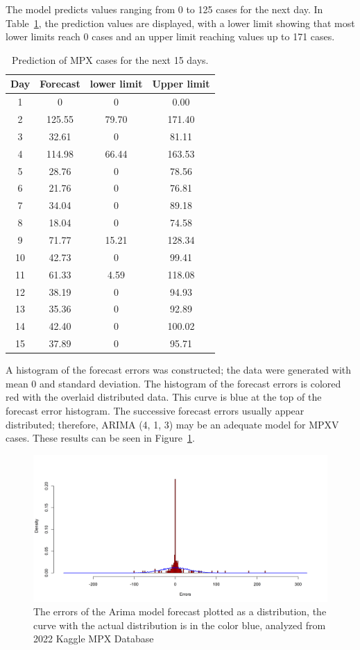 \documentclass[conference]{IEEEtran}
\begin{document}
The model predicts values ranging from 0 to 125 cases for the next day. In Table~\ref{Table:Forecasting}, the prediction values are displayed, with a lower limit showing that most lower limits reach 0 cases and an upper limit reaching values up to 171 cases.
\begin{table}[h!]

    \centering
    \caption{Prediction of MPX cases for the next 15 days.}
    \label{Table:Forecasting}
    \begin{tabular}{|c|c|c|c|}
    
     \hline
        Day &  Forecast & lower limit & Upper limit\\
     \hline
       1 & 0 & 0& 0.00\\
       2 & 125.55 & 79.70& 171.40\\
       3 & 32.61 &0 & 81.11\\
       4 & 114.98 &66.44 & 163.53\\
       5 & 28.76 &0 &78.56 \\
       6 &21.76 & 0&76.81 \\
       7 &34.04 & 0& 89.18\\
       8 & 18.04& 0& 74.58\\
       9 &71.77 &15.21 & 128.34\\
       10 & 42.73&0 & 99.41\\
       11& 61.33&4.59 & 118.08\\
       12 & 38.19&0 & 94.93\\
       13&35.36 & 0& 92.89\\
       14&42.40 & 0& 100.02\\
       15 & 37.89&0 & 95.71\\
     \hline
    \end{tabular}
    
\end{table}

A histogram of the forecast errors was constructed; the data were generated with mean 0 and standard deviation. The histogram of the forecast errors is colored red with the overlaid distributed data. This curve is blue at the top of the forecast error histogram. The successive forecast errors usually appear distributed; therefore, ARIMA (4, 1, 3) may be an adequate model for MPXV cases. These results can be seen in Figure~\ref{fig:HistErrors}. 
\begin{figure}[H]
    \centering
    \includegraphics[width = 8 cm]{HistErrors.png}
    \caption{The errors of the Arima model forecast plotted as a distribution, the curve with the actual distribution is in the color blue, analyzed from 2022 Kaggle MPX Database~\cite{Contractor2022}}
    \label{fig:HistErrors}
\end{figure}
\end{document}
